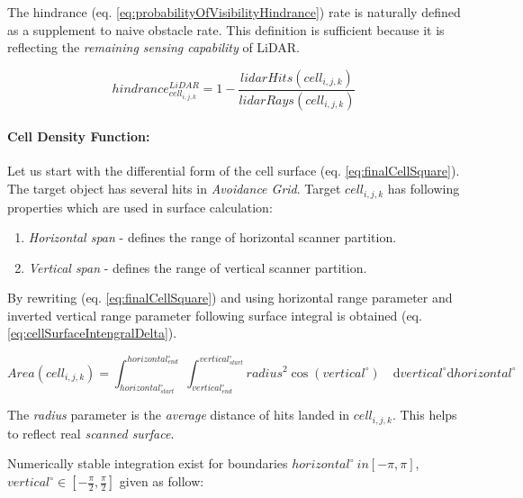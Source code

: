 \noindent The hindrance (eq. \ref{eq:probabilityOfVisibilityHindrance}) rate is naturally defined as a supplement to naive obstacle rate. This definition is sufficient because it is reflecting the \emph{remaining sensing capability} of  LiDAR.

\begin{equation}\label{eq:probabilityOfVisibilityHindrance}
    hindrance^{LiDAR}_{cell_{i,j,k}}=1-\frac{lidar Hits(cell_{i,j,k})}{lidar Rays(cell_{i,j,k})}
\end{equation}

\paragraph{Cell Density Function:}  Let us start with the differential form of the cell surface (eq. \ref{eq:finalCellSquare}). The target object has several hits in \emph{Avoidance Grid}. Target $cell_{i,j,k}$ has following properties which are used in surface calculation:
\begin{enumerate}
    \item \textit{Horizontal span} - defines the range of horizontal scanner partition.
    \item \textit{Vertical span} - defines the range of vertical scanner partition.
\end{enumerate}

\newpage\noindent By rewriting (eq. \ref{eq:finalCellSquare}) and using horizontal range parameter and inverted vertical range parameter following surface integral is obtained (eq. \ref{eq:cellSurfaceIntengralDelta}).

\begin{equation}\label{eq:cellSurfaceIntengralDelta}
    Area(cell_{i,j,k}) = \int_{horizontal_{start}^\circ}^{horizontal_{end}^\circ}\int_{vertical_{end}^\circ}^{vertical_{start}^\circ} radius^2 \cos(vertical^\circ) \quad \text{d} vertical^
    \circ\text{d} horizontal^\circ
\end{equation}

\begin{note}
    The \emph{radius} parameter is the \emph{average} distance of hits landed in $cell_{i,j,k}$. This helps to reflect real \emph{scanned surface}.
\end{note}

\noindent Numerically stable integration exist for boundaries $horizontal^\circ \ in [-\pi,\pi]$, $vertical^\circ \in [-\frac{\pi}{2},\frac{\pi}{2}]$ given as follow:


